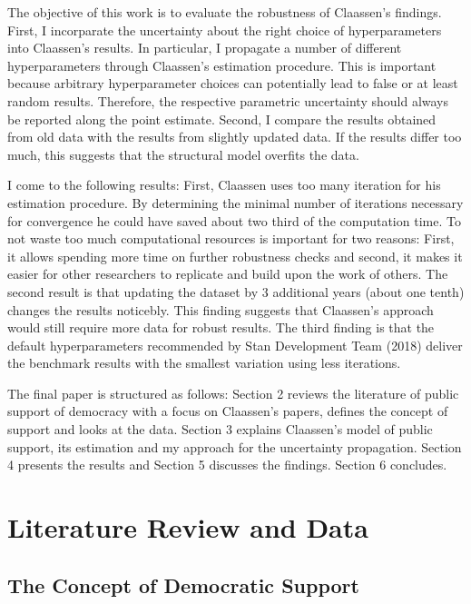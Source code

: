 \documentclass[12pt,english,a4paper,oneside]{article}
\theoremstyle{definition}
\theoremstyle{definition}
\theoremstyle{definition}
\theoremstyle{definition}
\theoremstyle{remark}
\begin{document}
The objective of this work is to evaluate the robustness of Claassen's findings. First, I incorparate the uncertainty about the right choice of hyperparameters into Claassen's results. In particular, I propagate a number of different hyperparameters through Claassen's estimation procedure. This is important because arbitrary hyperparameter choices can potentially lead to false or at least random results. Therefore, the respective parametric uncertainty should always be reported along the point estimate. Second, I compare the results obtained from old data with the results from slightly updated data. If the results differ too much, this suggests that the structural model overfits the data.

I come to the following results: First, Claassen uses too many iteration for his estimation procedure. By determining the minimal number of iterations necessary for convergence he could have saved about two third of the computation time. To not waste too much computational resources is important for two reasons: First, it allows spending more time on further robustness checks and second, it makes it easier for other researchers to replicate and build upon the work of others. The second result is that updating the dataset by 3 additional years (about one tenth) changes the results noticebly. This finding suggests that Claassen's approach would still require more data for robust results. The third finding is that the default hyperparameters recommended by Stan Development Team (2018) deliver the benchmark results with the smallest variation using less iterations.

The final paper is structured as follows: Section 2 reviews the literature of public support of democracy with a focus on Claassen's papers, defines the concept of support and looks at the data. Section 3 explains Claassen's model of public support, its estimation and my approach for the uncertainty propagation. Section 4 presents the results and Section 5 discusses the findings. Section 6 concludes.

\hypertarget{literature-review-and-data}{%
\section{Literature Review and Data}\label{literature-review-and-data}}

\hypertarget{the-concept-of-democratic-support}{%
\subsection{The Concept of Democratic Support}\label{the-concept-of-democratic-support}}
\end{document}
